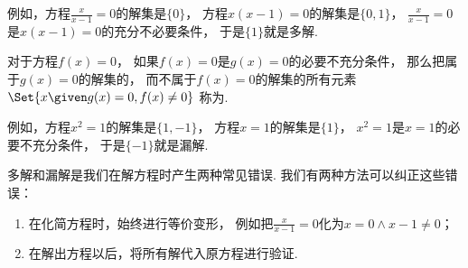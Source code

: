 例如，方程\(\frac{x}{x-1} = 0\)的解集是\(\{0\}\)，
方程\(x(x-1) = 0\)的解集是\(\{0,1\}\)，
\(\frac{x}{x-1} = 0\)是\(x(x-1) = 0\)的充分不必要条件，
于是\(\{1\}\)就是多解.

对于方程\(f(x) = 0\)，
如果\(f(x) = 0\)是\(g(x) = 0\)的必要不充分条件，
那么把属于\(g(x) = 0\)的解集的，
而不属于\(f(x) = 0\)的解集的所有元素
\(\Set{ x \given g(x) = 0, f(x) \neq 0 }\)
称为.

例如，方程\(x^2 = 1\)的解集是\(\{1,-1\}\)，
方程\(x = 1\)的解集是\(\{1\}\)，
\(x^2 = 1\)是\(x = 1\)的必要不充分条件，
于是\(\{-1\}\)就是漏解.

多解和漏解是我们在解方程时产生两种常见错误.
我们有两种方法可以纠正这些错误：\begin{enumerate}
	\item 在化简方程时，始终进行等价变形，
	例如把\(\frac{x}{x-1} = 0\)化为\(x = 0 \land x-1 \neq 0\)；

	\item 在解出方程以后，将所有解代入原方程进行验证.
\end{enumerate}

